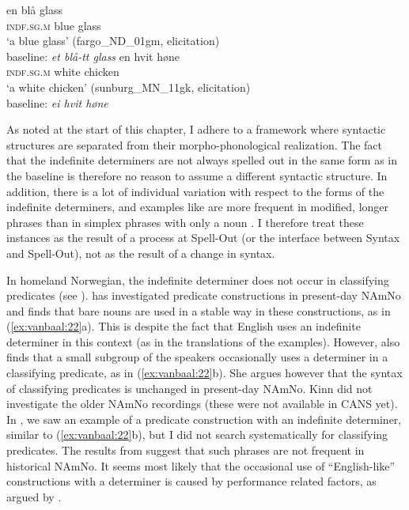 \documentclass[output=paper]{langscibook}
\begin{document}
\ea \label{ex:vanbaal:21}
\ea \label{ex:vanbaal:21a}
\gll en blå glass \\
    \textsc{indf.sg.m} blue glass \\
\glt `a blue glass' (fargo\_ND\_01gm, elicitation) \\
baseline: \textit{et blå-tt glass}
\ex\label{ex:vanbaal:21b}
\gll en hvit høne \\
    \textsc{indf.sg.m} white chicken \\
\glt `a white chicken' (sunburg\_MN\_11gk, elicitation) \\
baseline: \textit{ei hvit høne}\footnotemark
\z
\z
{}

As noted at the start of this chapter, I adhere to a framework where syntactic structures are separated from their morpho-phonological realization. The fact that the indefinite determiners are not always spelled out in the same form as in the baseline is therefore no reason to assume a different syntactic structure. In addition, there is a lot of individual variation with respect to the forms of the indefinite determiners, and examples like  are more frequent in modified, longer phrases than in simplex phrases with only a noun \citep{vanBaal2024Definiteness}. I therefore treat these instances as the result of a process at Spell-Out (or the interface between Syntax and Spell-Out), not as the result of a change in syntax.
 
In homeland Norwegian, the indefinite determiner does not occur in classifying predicates (see ). \citet{Kinn2020} has investigated predicate constructions in present-day NAmNo and finds that bare nouns are used in a stable way in these constructions, as in (\ref{ex:vanbaal:22}a). This is despite the fact that English uses an indefinite determiner in this context (as in the translations of the examples). However, \citet{Kinn2020} also finds that a small subgroup of the speakers occasionally uses a determiner in a classifying predicate, as in (\ref{ex:vanbaal:22}b). She argues however that the syntax of classifying predicates is unchanged in present-day NAmNo. Kinn did not investigate the older NAmNo recordings (these were not available in CANS yet). In , we saw an example of a predicate construction with an indefinite determiner, similar to (\ref{ex:vanbaal:22}b), but I did not search systematically for classifying predicates. The results from \citet{MorlandBA} suggest that such phrases are not frequent in historical NAmNo. It seems most likely that the occasional use of ``English\hyp like'' constructions with a determiner is caused by performance related factors, as argued by \citet{Kinn2020}.
 
\end{document}

